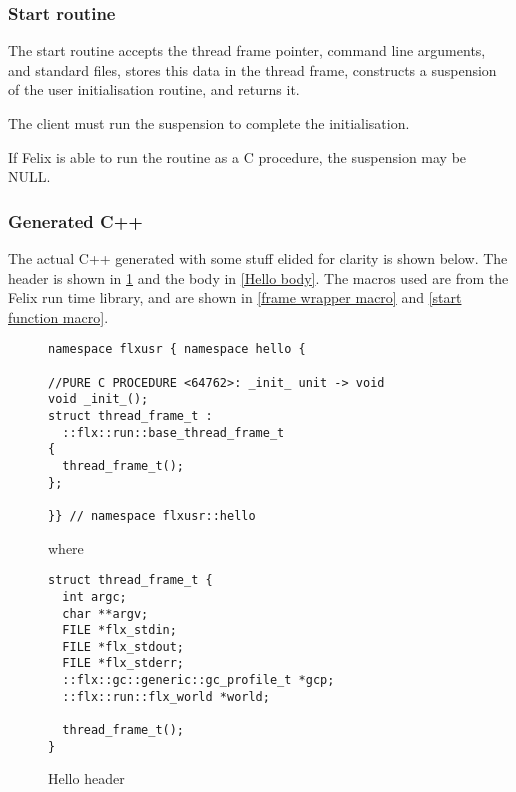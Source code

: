 \documentclass[oneside]{book}
\begin{document}
\subsubsection{Start routine}
The start routine accepts the thread frame pointer,
command line arguments, and standard files, stores
this data in the thread frame, constructs a suspension
of the user initialisation routine, and returns it.

The client must run the suspension to complete the initialisation.

If Felix is able to run the routine as a C procedure, the suspension
may be NULL.

\subsubsection{Generated C++}
The actual C++ generated with some stuff elided for clarity is shown below.
The header is shown in \ref{Hello header} and the body in \ref{Hello body}.
The macros used are from the Felix run time library, and are
shown in \ref{frame wrapper macro}
and \ref{start function macro}.


\begin{figure}[p]
\caption{Hello header\label{Hello header}}
\begin{verbatim}
namespace flxusr { namespace hello {

//PURE C PROCEDURE <64762>: _init_ unit -> void
void _init_();
struct thread_frame_t : 
  ::flx::run::base_thread_frame_t 
{
  thread_frame_t();
};

}} // namespace flxusr::hello
\end{verbatim}

where

\begin{verbatim}
struct thread_frame_t {
  int argc;
  char **argv;
  FILE *flx_stdin;
  FILE *flx_stdout;
  FILE *flx_stderr;
  ::flx::gc::generic::gc_profile_t *gcp;
  ::flx::run::flx_world *world;

  thread_frame_t();
}
\end{verbatim}
\end{figure}
\end{document}
